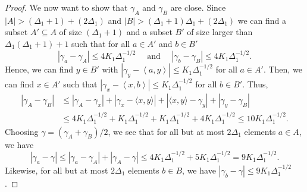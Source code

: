 \documentclass[reqno, 11pt]{amsart}
\theoremstyle{definition}
\theoremstyle{remark}
\newcommand{\ang}[1]{\left\langle #1 \right\rangle}
\begin{document}
\begin{proof}
We now want to show that $\gamma_A$ and $\gamma_B$ are close. Since $|A| > (\Delta_1+1) + (2\Delta_1)$ and $|B| > (\Delta_1 + 1)\Delta_1 + (2\Delta_1)$  we can find a subset $A' \subseteq A$ of size $(\Delta_1 + 1)$ and a subset $B'$ of size larger than $\Delta_1(\Delta_1 + 1)+1$ such that for all $a \in A'$ and $b \in B'$
\[
	|\gamma_a - \gamma_A| \leq 4K_1\Delta_1^{-1/2} \quad \text{ and } \quad |\gamma_b - \gamma_B| \leq 4K_1\Delta_1^{-1/2}.
\]
Hence, we can find $y \in B'$ with $|\gamma_y - \ang{a,y}| \leq K_1\Delta_1^{-1/2}$ for all $a \in A'$. Then, we can find $x \in A'$ such that $|\gamma_x - \ang{x, b}| \leq K_1 \Delta_1^{-1/2}$ for all $b \in B'$. Thus,
	\begin{align*}
		|\gamma_A - \gamma_B| &\leq |\gamma_A-\gamma_x|+|\gamma_x-\langle x, y\rangle
		| + |\langle x, y\rangle - \gamma_y| + |\gamma_y - \gamma_B| \\
	          &\leq 4K_1\Delta_1^{-1/2} +  K_1\Delta_1^{-1/2} +  K_1\Delta_1^{-1/2}+4K_1\Delta_1^{-1/2} \leq 10K_1\Delta_1^{-1/2}.
	\end{align*}
Choosing $\gamma = (\gamma_A + \gamma_B)/2$, we see that for all but at most $2\Delta_1$ elements $a \in A$, we have
\[
    |\gamma_a  -  \gamma| \leq |\gamma_a-\gamma_A| + |\gamma_A - \gamma| \leq 4K_1\Delta_1^{-1/2} + 5K_1\Delta_1^{-1/2} = 9 K_1\Delta_1^{-1/2}.
\]
Likewise, for all but at most $2\Delta_1$ elements $b \in B$, we have $|\gamma_b - \gamma| \leq 9K_1\Delta_1^{-1/2}$. 
\end{proof}
\end{document}
